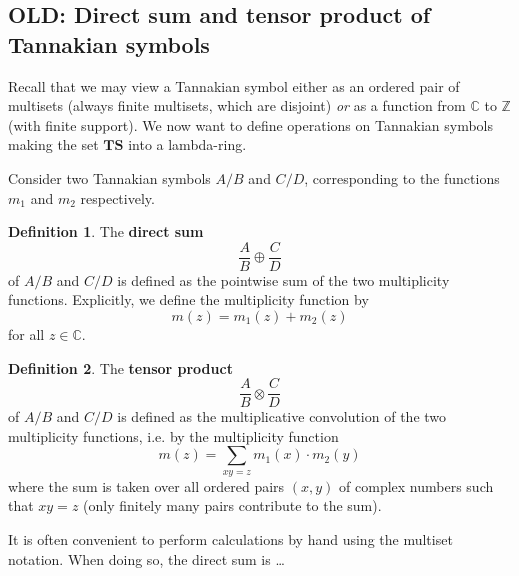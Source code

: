 \documentclass[a4paper]{article}
\theoremstyle{definition}
\newtheorem{definition}{Definition}[section]
\theoremstyle{remark}
\newcommand{\Z}{\mathbb{Z}}
\newcommand{\C}{\mathbb{C}}
\newcommand{\TS}{\mathbf{TS}}
\newcommand{\defhl}[1]{\textbf{#1}}
\begin{document}
\subsection{OLD: Direct sum and tensor product of Tannakian symbols}

Recall that we may view a Tannakian symbol either as an ordered pair of multisets (always finite multisets, which are disjoint) \emph{or} as a function from $\C$ to $\Z$ (with finite support). We now want to define operations on Tannakian symbols making the set $\TS$ into a lambda-ring. 

Consider two Tannakian symbols $A/B$ and $C/D$, corresponding to the functions $m_1$ and $m_2$ respectively.

\begin{definition} 
The \defhl{direct sum} 
$$ \frac{A}{B}  \oplus \frac{C}{D}   $$
of $A/B$ and $C/D$ is defined as the pointwise sum of the two multiplicity functions. Explicitly, we define the multiplicity function by
$$ m(z) = m_1(z) + m_2(z)  $$
for all $z \in \C$. 
\end{definition}

\begin{definition} 
The \defhl{tensor product} 
$$ \frac{A}{B}  \otimes \frac{C}{D}   $$
of $A/B$ and $C/D$ is defined as the multiplicative convolution of the two multiplicity functions, i.e. by the multiplicity function
$$ m(z) = \sum_{xy = z} m_1(x) \cdot m_2(y)  $$
where the sum is taken over all ordered pairs $(x, y)$ of complex numbers such that $xy=z$ (only finitely many pairs contribute to the sum). 
\end{definition}

It is often convenient to perform calculations by hand using the multiset notation. When doing so, the direct sum is \ldots
\end{document}
